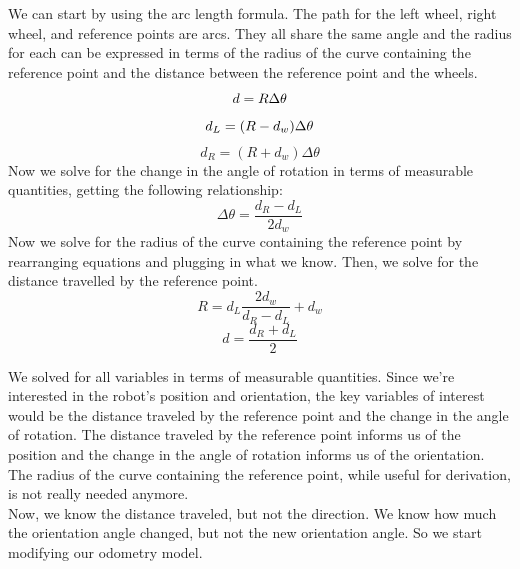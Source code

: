 We can start by using the arc length formula. The path for the left wheel, right wheel, and reference points are arcs. They all share the same angle and the radius for each can be expressed in terms of the radius of the curve containing the reference point and the distance between the reference point and the wheels.
\begin{equation}\label{eq:2}
    d =  R\Delta \theta\\
\end{equation}
\begin{equation}\label{eq:3}
    d_L = (R-d_w)\Delta \theta\\
\end{equation}
\begin{equation}\label{eq:4}
    d_R = (R+d_w)\Delta \theta
\end{equation}
Now we solve for the change in the angle of rotation in terms of measurable quantities, getting the following relationship:
\begin{equation}\label{eq:5}
    \Delta \theta = \frac{d_R - d_L}{2d_w}
\end{equation}
Now we solve for the radius of the curve containing the reference point by rearranging equations and plugging in what we know. Then, we solve for the distance travelled by the reference point.
\begin{equation}\label{eq:6}
    R = d_L \frac{2d_w}{d_R - d_L}+d_w
\end{equation}
\begin{equation}\label{eq:7}
    d = \frac{d_R + d_L}{2}
\end{equation}

We solved for all variables in terms of measurable quantities. Since we’re interested in the robot’s position and orientation, the key variables of interest would be the distance traveled by the reference point and the change in the angle of rotation. The distance traveled by the reference point informs us of the position and the change in the angle of rotation informs us of the orientation. The radius of the curve containing the reference point, while useful for derivation, is not really needed anymore.\\

Now, we know the distance traveled, but not the direction. We know how much the orientation angle changed, but not the new orientation angle. So we start modifying our odometry model.\\

